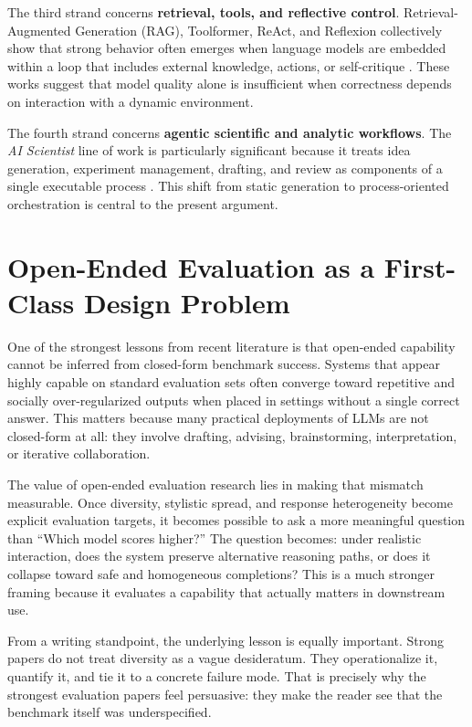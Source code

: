 The third strand concerns \textbf{retrieval, tools, and reflective control}. Retrieval-Augmented Generation (RAG), Toolformer, ReAct, and Reflexion collectively show that strong behavior often emerges when language models are embedded within a loop that includes external knowledge, actions, or self-critique \citep{lewis2020rag,schick2023toolformer,yao2023react,shinn2023reflexion}. These works suggest that model quality alone is insufficient when correctness depends on interaction with a dynamic environment.

The fourth strand concerns \textbf{agentic scientific and analytic workflows}. The \emph{AI Scientist} line of work is particularly significant because it treats idea generation, experiment management, drafting, and review as components of a single executable process \citep{aiscientist2024,aiscientistv2_2025}. This shift from static generation to process-oriented orchestration is central to the present argument.

\section{Open-Ended Evaluation as a First-Class Design Problem}
One of the strongest lessons from recent literature is that open-ended capability cannot be inferred from closed-form benchmark success. Systems that appear highly capable on standard evaluation sets often converge toward repetitive and socially over-regularized outputs when placed in settings without a single correct answer. This matters because many practical deployments of LLMs are not closed-form at all: they involve drafting, advising, brainstorming, interpretation, or iterative collaboration.

The value of open-ended evaluation research lies in making that mismatch measurable. Once diversity, stylistic spread, and response heterogeneity become explicit evaluation targets, it becomes possible to ask a more meaningful question than ``Which model scores higher?'' The question becomes: under realistic interaction, does the system preserve alternative reasoning paths, or does it collapse toward safe and homogeneous completions? This is a much stronger framing because it evaluates a capability that actually matters in downstream use.

From a writing standpoint, the underlying lesson is equally important. Strong papers do not treat diversity as a vague desideratum. They operationalize it, quantify it, and tie it to a concrete failure mode. That is precisely why the strongest evaluation papers feel persuasive: they make the reader see that the benchmark itself was underspecified.


